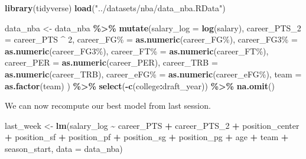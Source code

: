 \documentclass[
]{book}
\newenvironment{Shaded}{\begin{snugshade}}{\end{snugshade}}
\newcommand{\AttributeTok}[1]{\textcolor[rgb]{0.13,0.29,0.53}{#1}}
\newcommand{\DecValTok}[1]{\textcolor[rgb]{0.00,0.00,0.81}{#1}}
\newcommand{\FunctionTok}[1]{\textcolor[rgb]{0.13,0.29,0.53}{\textbf{#1}}}
\newcommand{\NormalTok}[1]{#1}
\newcommand{\OtherTok}[1]{\textcolor[rgb]{0.56,0.35,0.01}{#1}}
\newcommand{\SpecialCharTok}[1]{\textcolor[rgb]{0.81,0.36,0.00}{\textbf{#1}}}
\newcommand{\StringTok}[1]{\textcolor[rgb]{0.31,0.60,0.02}{#1}}
\begin{document}
\begin{Shaded}
\begin{Highlighting}[]
\FunctionTok{library}\NormalTok{(tidyverse)}
\FunctionTok{load}\NormalTok{(}\StringTok{"../datasets/nba/data\_nba.RData"}\NormalTok{)}

\NormalTok{data\_nba }\OtherTok{\textless{}{-}}\NormalTok{ data\_nba }\SpecialCharTok{\%\textgreater{}\%} 
  \FunctionTok{mutate}\NormalTok{(}\AttributeTok{salary\_log =} \FunctionTok{log}\NormalTok{(salary),}
         \AttributeTok{career\_PTS\_2 =}\NormalTok{ career\_PTS }\SpecialCharTok{\^{}} \DecValTok{2}\NormalTok{,}
         \StringTok{\textasciigrave{}}\AttributeTok{career\_FG\%}\StringTok{\textasciigrave{}} \OtherTok{=} \FunctionTok{as.numeric}\NormalTok{(}\StringTok{\textasciigrave{}}\AttributeTok{career\_FG\%}\StringTok{\textasciigrave{}}\NormalTok{),}
         \StringTok{\textasciigrave{}}\AttributeTok{career\_FG3\%}\StringTok{\textasciigrave{}} \OtherTok{=} \FunctionTok{as.numeric}\NormalTok{(}\StringTok{\textasciigrave{}}\AttributeTok{career\_FG3\%}\StringTok{\textasciigrave{}}\NormalTok{),}
         \StringTok{\textasciigrave{}}\AttributeTok{career\_FT\%}\StringTok{\textasciigrave{}} \OtherTok{=} \FunctionTok{as.numeric}\NormalTok{(}\StringTok{\textasciigrave{}}\AttributeTok{career\_FT\%}\StringTok{\textasciigrave{}}\NormalTok{),}
         \AttributeTok{career\_PER =} \FunctionTok{as.numeric}\NormalTok{(career\_PER),}
         \AttributeTok{career\_TRB =} \FunctionTok{as.numeric}\NormalTok{(career\_TRB),}
         \StringTok{\textasciigrave{}}\AttributeTok{career\_eFG\%}\StringTok{\textasciigrave{}} \OtherTok{=} \FunctionTok{as.numeric}\NormalTok{(}\StringTok{\textasciigrave{}}\AttributeTok{career\_eFG\%}\StringTok{\textasciigrave{}}\NormalTok{),}
         \AttributeTok{team =} \FunctionTok{as.factor}\NormalTok{(team)}
\NormalTok{  ) }\SpecialCharTok{\%\textgreater{}\%} 
  \FunctionTok{select}\NormalTok{(}\SpecialCharTok{{-}}\FunctionTok{c}\NormalTok{(college}\SpecialCharTok{:}\NormalTok{draft\_year)) }\SpecialCharTok{\%\textgreater{}\%} 
  \FunctionTok{na.omit}\NormalTok{()}
\end{Highlighting}
\end{Shaded}

We can now recompute our best model from last session.

\begin{Shaded}
\begin{Highlighting}[]
\NormalTok{last\_week }\OtherTok{\textless{}{-}} \FunctionTok{lm}\NormalTok{(salary\_log }\SpecialCharTok{\textasciitilde{}}\NormalTok{ career\_PTS }\SpecialCharTok{+}\NormalTok{ career\_PTS\_2 }\SpecialCharTok{+} 
\NormalTok{                  position\_center }\SpecialCharTok{+}\NormalTok{ position\_sf }\SpecialCharTok{+}\NormalTok{ position\_pf }\SpecialCharTok{+}\NormalTok{ position\_sg }\SpecialCharTok{+}\NormalTok{ position\_pg }\SpecialCharTok{+}
\NormalTok{                  age }\SpecialCharTok{+}\NormalTok{ team }\SpecialCharTok{+}\NormalTok{ season\_start,}
                \AttributeTok{data =}\NormalTok{ data\_nba)}
\end{Highlighting}
\end{Shaded}
\end{document}
